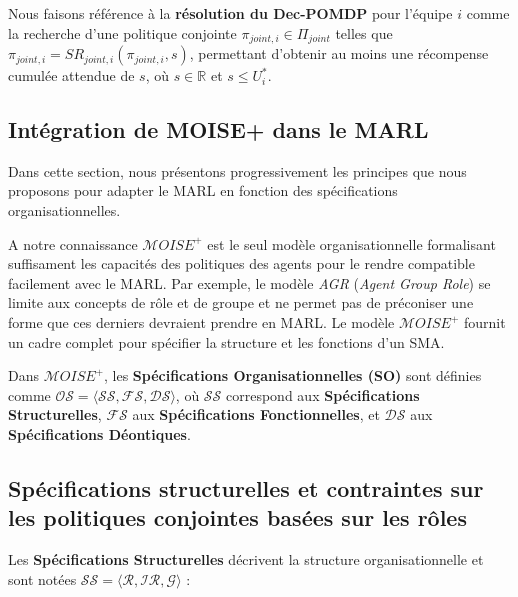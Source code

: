 \documentclass[sigconf,anonymous]{aamas}
\begin{document}
Nous faisons référence à la \textbf{résolution du Dec-POMDP} pour l'équipe $i$ comme la recherche d'une politique conjointe $\pi_{joint,i} \in \Pi_{joint}$ telles que $\pi_{joint,i} = SR_{joint,i}(\pi_{joint,i}, s)$, permettant d'obtenir au moins une récompense cumulée attendue de $s$, où $s \in \mathbb{R}$ et $s \leq U_i^*$.

\subsection{Intégration de MOISE+ dans le MARL}

Dans cette section, nous présentons progressivement les principes que nous proposons pour adapter le MARL en fonction des spécifications organisationnelles.

A notre connaissance $\mathcal{M}OISE^+$ est le seul modèle organisationnelle formalisant suffisament les capacités des politiques des agents pour le rendre compatible facilement avec le MARL. Par exemple, le modèle \textit{AGR} (\textit{Agent Group Role}) se limite aux concepts de rôle et de groupe et ne permet pas de préconiser une forme que ces derniers devraient prendre en MARL. Le modèle $\mathcal{M}OISE^+$ fournit un cadre complet pour spécifier la structure et les fonctions d'un SMA.

Dans $\mathcal{M}OISE^+$, les \textbf{Spécifications Organisationnelles (SO)} sont définies comme $\mathcal{OS} = \langle \mathcal{SS}, \mathcal{FS}, \mathcal{DS} \rangle$, où $\mathcal{SS}$ correspond aux \textbf{Spécifications Structurelles}, $\mathcal{FS}$ aux \textbf{Spécifications Fonctionnelles}, et $\mathcal{DS}$ aux \textbf{Spécifications Déontiques}.

\subsection{Spécifications structurelles et contraintes sur les politiques conjointes basées sur les rôles}

Les \textbf{Spécifications Structurelles} décrivent la structure organisationnelle et sont notées $\mathcal{SS} = \langle \mathcal{R}, \mathcal{IR}, \mathcal{G} \rangle$ :
\end{document}
